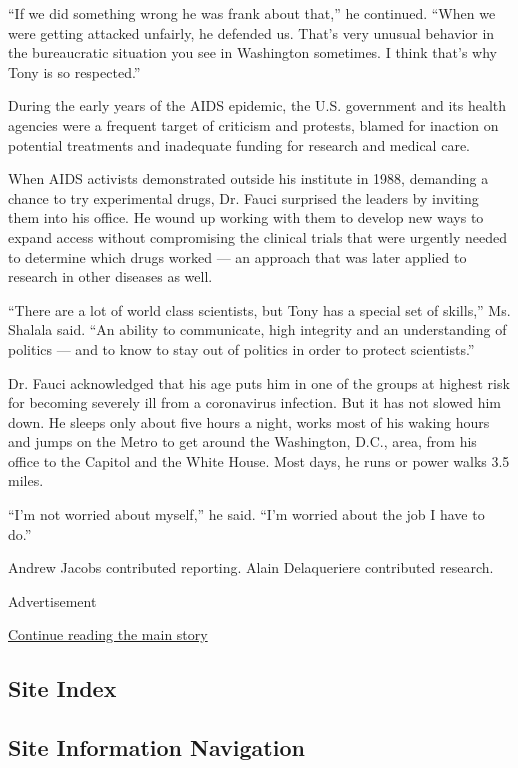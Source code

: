 ``If we did something wrong he was frank about that,'' he continued.
``When we were getting attacked unfairly, he defended us. That's very
unusual behavior in the bureaucratic situation you see in Washington
sometimes. I think that's why Tony is so respected.''

During the early years of the AIDS epidemic, the U.S. government and its
health agencies were a frequent target of criticism and protests, blamed
for inaction on potential treatments and inadequate funding for research
and medical care.

When AIDS activists demonstrated outside his institute in 1988,
demanding a chance to try experimental drugs, Dr. Fauci surprised the
leaders by inviting them into his office. He wound up working with them
to develop new ways to expand access without compromising the clinical
trials that were urgently needed to determine which drugs worked --- an
approach that was later applied to research in other diseases as well.

``There are a lot of world class scientists, but Tony has a special set
of skills,'' Ms. Shalala said. ``An ability to communicate, high
integrity and an understanding of politics --- and to know to stay out
of politics in order to protect scientists.''

Dr. Fauci acknowledged that his age puts him in one of the groups at
highest risk for becoming severely ill from a coronavirus infection. But
it has not slowed him down. He sleeps only about five hours a night,
works most of his waking hours and jumps on the Metro to get around the
Washington, D.C., area, from his office to the Capitol and the White
House. Most days, he runs or power walks 3.5 miles.

``I'm not worried about myself,'' he said. ``I'm worried about the job I
have to do.''

Andrew Jacobs contributed reporting. Alain Delaqueriere contributed
research.

Advertisement

\protect\hyperlink{after-bottom}{Continue reading the main story}

\hypertarget{site-index}{%
\subsection{Site Index}\label{site-index}}

\hypertarget{site-information-navigation}{%
\subsection{Site Information
Navigation}\label{site-information-navigation}}

